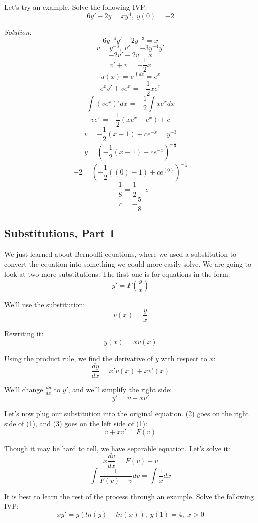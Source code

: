 Let's try an example. Solve the following IVP:
$$6y' - 2y = xy^{4},\;y(0) = -2$$

\textit{Solution:}
$$6y^{-4}y' - 2y^{-3} = x$$
$$v = y^{-3},\;v' = -3y^{-4}y'$$
$$-2v' - 2v = x$$
$$v' + v = -\frac{1}{2}x$$
$$u(x) = e^{\int dx} = e^{x}$$
$$e^{x}v' + ve^{x} = -\frac{1}{2}xe^{x}$$
$$\int (ve^{x})'dx = -\frac{1}{2}\int xe^{x}dx$$
$$ve^{x} = -\frac{1}{2}(xe^{x} - e^{x}) + c$$
$$v = -\frac{1}{2}(x - 1) + ce^{-x} = y^{-3}$$
$$y = \left(-\frac{1}{2}(x - 1) + ce^{-x}\right)^{-\frac{1}{3}}$$
$$-2 = \left(-\frac{1}{2}((0) - 1) + ce^{(0)}\right)^{-\frac{1}{3}}$$
$$-\frac{1}{8} = \frac{1}{2} + c$$
$$c = -\frac{5}{8}$$
\begin{center}
\end{center}

\subsection{Substitutions, Part 1}
We just learned about Bernoulli equations, where we used a substitution to convert the equation into something we could more easily solve. We are going to look at two more substitutions. The first one is for equations in the form:
\begin{equation}
	y' = F\left(\frac{y}{x}\right)
\end{equation}

We'll use the substitution:
\begin{equation}
	v(x) = \frac{y}{x}
\end{equation}

Rewriting it:
$$y(x) = xv(x)$$

Using the product rule, we find the derivative of $y$ with respect to $x$:
$$\frac{dy}{dx} = x'v(x) + xv'(x)$$

We'll change $\frac{dy}{dx}$ to $y'$, and we'll simplify the right side:
\begin{equation}
	y' = v + xv'
\end{equation}

Let's now plug our substitution into the original equation. (2) goes on the right side of (1), and (3) goes on the left side of (1):
$$v + xv' = F(v)$$

Though it may be hard to tell, we have separable equation. Let's solve it:
$$x\frac{dv}{dx} = F(v) - v$$
$$\int \frac{1}{F(v) - v}dv = \int \frac{1}{x}dx$$

It is best to learn the rest of the process through an example. Solve the following IVP:
$$xy' = y(ln(y) - ln(x)),\;y(1) = 4,\;x > 0$$

